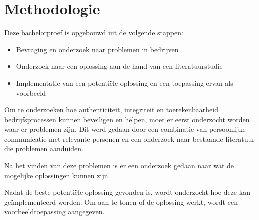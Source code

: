 
\chapter{Methodologie}
\label{ch:methodologie}


Deze bachelorproef is opgebouwd uit de volgende stappen:
\begin{itemize}
	\item Bevraging en onderzoek naar problemen in bedrijven
	\item Onderzoek naar een oplossing aan de hand van een literatuurstudie
	\item Implementatie van een potentiële oplossing en een toepassing ervan als voorbeeld
\end{itemize}

Om te onderzoeken hoe \gls{authenticiteit}, \gls{integriteit} en \gls{toerekenbaarheid} bedrijfsprocessen kunnen beveiligen en helpen, moet er eerst onderzocht worden waar er problemen zijn. Dit werd gedaan door een combinatie van persoonlijke communicatie met relevante personen en een onderzoek naar bestaande literatuur die problemen aanduiden.

Na het vinden van deze problemen is er een onderzoek gedaan naar wat de mogelijke oplossingen kunnen zijn.

Nadat de beste potentiële oplossing gevonden is, wordt onderzocht hoe deze kan geïmplementeerd worden. Om aan te tonen of de oplossing werkt, wordt een voorbeeldtoepassing aangegeven.
